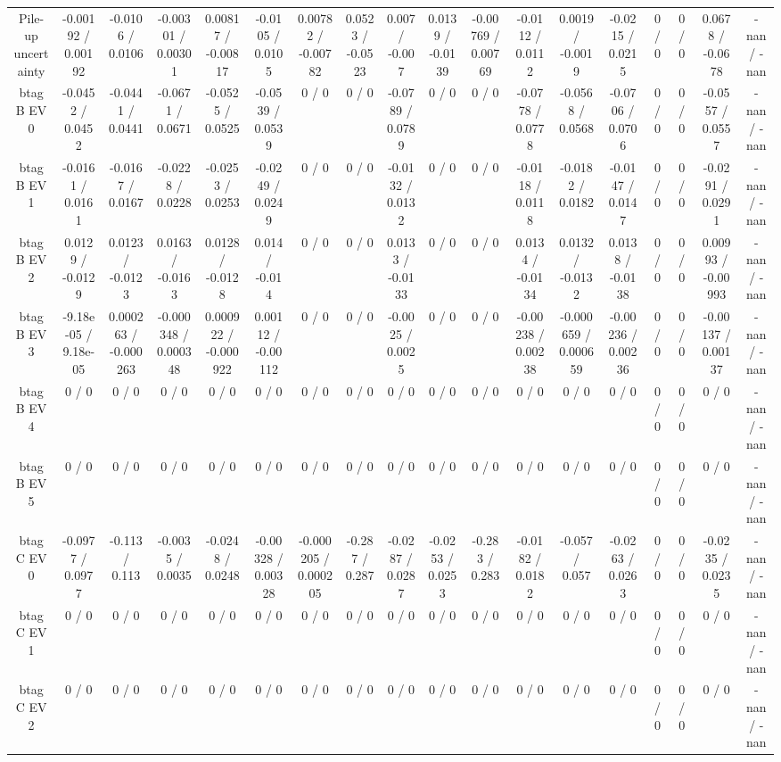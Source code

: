 \documentclass[10pt]{article}
\begin{document}
\begin{table}[htbp]
\begin{center}
\begin{tabular}{|c|c|c|c|c|c|c|c|c|c|c|c|c|c|c|c|c|c|}
  Pile-up uncertainty & -0.00192 / 0.00192 & -0.0106 / 0.0106 & -0.00301 / 0.00301 & 0.00817 / -0.00817 & -0.0105 / 0.0105 & 0.00782 / -0.00782 & 0.0523 / -0.0523 & 0.007 / -0.007 & 0.0139 / -0.0139 & -0.00769 / 0.00769 & -0.0112 / 0.0112 & 0.0019 / -0.0019 & -0.0215 / 0.0215 & 0 / 0 & 0 / 0 & 0.0678 / -0.0678 & -nan / -nan \\ 
  btag B EV 0 & -0.0452 / 0.0452 & -0.0441 / 0.0441 & -0.0671 / 0.0671 & -0.0525 / 0.0525 & -0.0539 / 0.0539 & 0 / 0 & 0 / 0 & -0.0789 / 0.0789 & 0 / 0 & 0 / 0 & -0.0778 / 0.0778 & -0.0568 / 0.0568 & -0.0706 / 0.0706 & 0 / 0 & 0 / 0 & -0.0557 / 0.0557 & -nan / -nan \\ 
  btag B EV 1 & -0.0161 / 0.0161 & -0.0167 / 0.0167 & -0.0228 / 0.0228 & -0.0253 / 0.0253 & -0.0249 / 0.0249 & 0 / 0 & 0 / 0 & -0.0132 / 0.0132 & 0 / 0 & 0 / 0 & -0.0118 / 0.0118 & -0.0182 / 0.0182 & -0.0147 / 0.0147 & 0 / 0 & 0 / 0 & -0.0291 / 0.0291 & -nan / -nan \\ 
  btag B EV 2 & 0.0129 / -0.0129 & 0.0123 / -0.0123 & 0.0163 / -0.0163 & 0.0128 / -0.0128 & 0.014 / -0.014 & 0 / 0 & 0 / 0 & 0.0133 / -0.0133 & 0 / 0 & 0 / 0 & 0.0134 / -0.0134 & 0.0132 / -0.0132 & 0.0138 / -0.0138 & 0 / 0 & 0 / 0 & 0.00993 / -0.00993 & -nan / -nan \\ 
  btag B EV 3 & -9.18e-05 / 9.18e-05 & 0.000263 / -0.000263 & -0.000348 / 0.000348 & 0.000922 / -0.000922 & 0.00112 / -0.00112 & 0 / 0 & 0 / 0 & -0.0025 / 0.0025 & 0 / 0 & 0 / 0 & -0.00238 / 0.00238 & -0.000659 / 0.000659 & -0.00236 / 0.00236 & 0 / 0 & 0 / 0 & -0.00137 / 0.00137 & -nan / -nan \\ 
  btag B EV 4 & 0 / 0 & 0 / 0 & 0 / 0 & 0 / 0 & 0 / 0 & 0 / 0 & 0 / 0 & 0 / 0 & 0 / 0 & 0 / 0 & 0 / 0 & 0 / 0 & 0 / 0 & 0 / 0 & 0 / 0 & 0 / 0 & -nan / -nan \\ 
  btag B EV 5 & 0 / 0 & 0 / 0 & 0 / 0 & 0 / 0 & 0 / 0 & 0 / 0 & 0 / 0 & 0 / 0 & 0 / 0 & 0 / 0 & 0 / 0 & 0 / 0 & 0 / 0 & 0 / 0 & 0 / 0 & 0 / 0 & -nan / -nan \\ 
  btag C EV 0 & -0.0977 / 0.0977 & -0.113 / 0.113 & -0.0035 / 0.0035 & -0.0248 / 0.0248 & -0.00328 / 0.00328 & -0.000205 / 0.000205 & -0.287 / 0.287 & -0.0287 / 0.0287 & -0.0253 / 0.0253 & -0.283 / 0.283 & -0.0182 / 0.0182 & -0.057 / 0.057 & -0.0263 / 0.0263 & 0 / 0 & 0 / 0 & -0.0235 / 0.0235 & -nan / -nan \\ 
  btag C EV 1 & 0 / 0 & 0 / 0 & 0 / 0 & 0 / 0 & 0 / 0 & 0 / 0 & 0 / 0 & 0 / 0 & 0 / 0 & 0 / 0 & 0 / 0 & 0 / 0 & 0 / 0 & 0 / 0 & 0 / 0 & 0 / 0 & -nan / -nan \\ 
  btag C EV 2 & 0 / 0 & 0 / 0 & 0 / 0 & 0 / 0 & 0 / 0 & 0 / 0 & 0 / 0 & 0 / 0 & 0 / 0 & 0 / 0 & 0 / 0 & 0 / 0 & 0 / 0 & 0 / 0 & 0 / 0 & 0 / 0 & -nan / -nan \\ 

\end{tabular}
\end{center}
\end{table}
\end{document}
